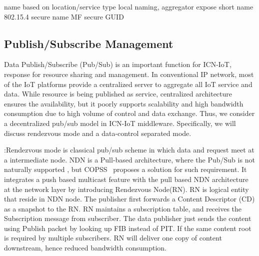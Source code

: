 name based on location/service type
local naming, aggregator expose short name
802.15.4 secure name MF secure GUID
\subsection{Publish/Subscribe Management}
Data Publish/Subscribe (Pub/Sub) is an important function for ICN-IoT, response for resource sharing and management. In conventional IP network, most of the IoT platforms provide a centralized server to aggregate all IoT service and data. While resource is being published as service,  centralized architecture ensures the availability, but it poorly supports scalability and high bandwidth consumption due to high volume of control and data exchange. Thus, we consider a decentralized pub/sub model in ICN-IoT middleware. Specifically, we will discuss rendezvous mode and a data-control separated mode.

\vspace{1mm}:Rendezvous mode is classical pub/sub scheme in which data and request meet at a intermediate node. NDN is a Pull-based architecture, where the Pub/Sub is not naturally supported , but COPSS~\cite{**copss paper**} proposes a solution for such requirement. It integrates a push based multicast feature with the pull based NDN architecture at the network layer by introducing Rendezvous Node(RN). RN is logical entity that reside in NDN node. The publisher first forwards a Content Descriptor (CD) as a snapshot to the RN. RN maintains a subscription table, and receives the Subscription message from subscriber. The data publisher just sends the content using Publish packet by looking up FIB instead of PIT. If the same content root is required by multiple subscribers. RN will deliver one copy  of content downstream, hence reduced bandwidth consumption.

